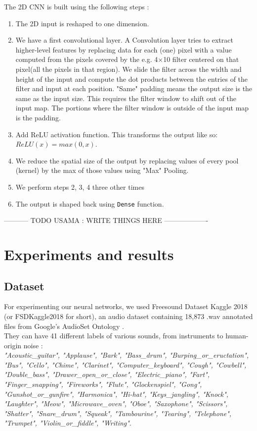 \documentclass{article} %
\begin{document}
		The 2D CNN is built using the following steps :
		\begin{enumerate} 
			\item The 2D input is reshaped to one dimension.
			\item We have a first convolutional layer. A Convolution layer tries to extract higher-level features by replacing data for each (one) pixel with a value computed from the pixels covered by the e.g. 4×10 filter centered on that pixel(all the pixels in that region). We slide the filter across the width and height of the input and compute the dot products between the entries of the filter and input at each position. "Same" padding means the output size is the same as the input size. This requires the filter window to shift out of the input map. The portions where the filter window is outside of the input map is the padding.
			\item Add ReLU activation function. This transforms the output like so: $ReLU(x) = max(0,x)$.
			\item  We reduce the spatial size of the output by replacing values of every pool (kernel) by the max of those values using "Max" Pooling.
			\item We perform steps 2, 3, 4 three other times
			\item The output is shaped back using \verb+Dense+ function. 
		\end{enumerate}

		----------- TODO USAMA : WRITE THINGS HERE -------------------

\section{Experiments and results}
	\subsection{Dataset}
		For experimenting our neural networks, we used Freesound Dataset Kaggle 2018 (or FSDKaggle2018 for short), an audio dataset containing 18,873 .wav annotated files from Google's AudioSet Ontology \cite{audioset}.\\
		They can have 41 different labels of various sounds, from instruments to human-origin noise :\\
		\textit{"Acoustic\_guitar", "Applause", "Bark", "Bass\_drum", "Burping\_or\_eructation", "Bus", "Cello", "Chime", "Clarinet", "Computer\_keyboard", "Cough", "Cowbell", "Double\_bass", "Drawer\_open\_or\_close", "Electric\_piano", "Fart", "Finger\_snapping", "Fireworks", "Flute", "Glockenspiel", "Gong", "Gunshot\_or\_gunfire", "Harmonica", "Hi-hat", "Keys\_jangling", "Knock", "Laughter", "Meow", "Microwave\_oven", "Oboe", "Saxophone", "Scissors", "Shatter", "Snare\_drum", "Squeak", "Tambourine", "Tearing", "Telephone", "Trumpet", "Violin\_or\_fiddle", "Writing"}.\\
\end{document}
